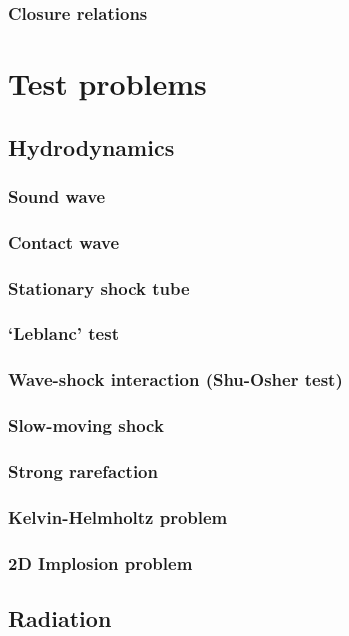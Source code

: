\documentclass[fleqn,usenatbib]{mnras}
\begin{document}
\subsubsection{Closure relations}

\section{Test problems}
\label{section:tests}

\subsection{Hydrodynamics}
\subsubsection{Sound wave}
\subsubsection{Contact wave}
\subsubsection{Stationary shock tube}
\subsubsection{`Leblanc' test}
\subsubsection{Wave-shock interaction (Shu-Osher test)}
\subsubsection{Slow-moving shock}
\subsubsection{Strong rarefaction}
\subsubsection{Kelvin-Helmholtz problem}
\subsubsection{2D Implosion problem}

\subsection{Radiation}
\end{document}

